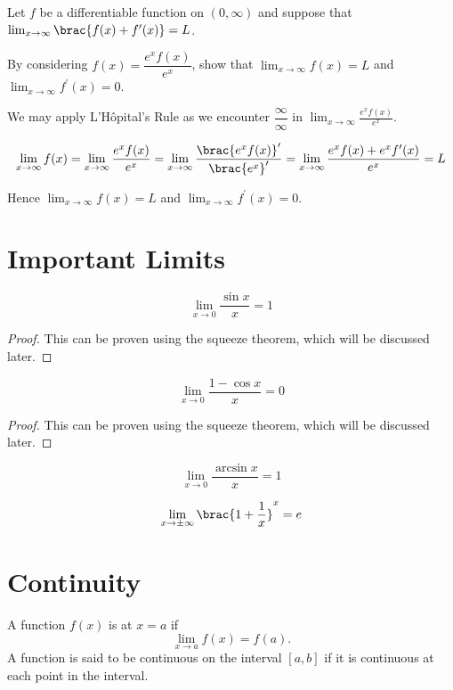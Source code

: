 \begin{exercise}
Let $f$ be a differentiable function on $(0,\infty)$ and suppose that $\lim_{x\to\infty}\brac{f(x)+f^\prime(x)}=L$.

By considering $f(x)=\dfrac{e^xf(x)}{e^x}$, show that $\lim_{x\to\infty}f(x)=L$ and $\lim_{x\to\infty}f^\prime(x)=0$.
\end{exercise}

\begin{solution}
We may apply L'H\^{o}pital's Rule as we encounter $\dfrac{\infty}{\infty}$ in $\displaystyle\lim_{x\to\infty}\frac{e^xf(x)}{e^x}$.

\[ \lim_{x\to\infty}f(x)=\lim_{x\to\infty}\frac{e^xf(x)}{e^x}=\lim_{x\to\infty}\frac{\brac{e^xf(x)}^\prime}{\brac{e^x}^\prime}=\lim_{x\to\infty}\frac{e^xf(x)+e^xf^\prime(x)}{e^x}=L \]

Hence $\lim_{x\to\infty}f(x)=L$ and $\lim_{x\to\infty}f^\prime(x)=0$.
\end{solution}
\pagebreak



\section{Important Limits}
\begin{equation}
\lim_{x \to 0} \frac{\sin x}{x} = 1
\end{equation}
\begin{proof}
This can be proven using the squeeze theorem, which will be discussed later.
\end{proof}

\begin{equation}
\lim_{x \to 0} \frac{1-\cos x}{x} = 0
\end{equation}
\begin{proof}
This can be proven using the squeeze theorem, which will be discussed later.
\end{proof}

\begin{equation}
\lim_{x\to 0} \frac{\arcsin x}{x} = 1
\end{equation}

\begin{equation}
\lim_{x\to \pm\infty} \brac{1+\frac{1}{x}}^x=e
\end{equation}
\pagebreak

\section{Continuity}
\begin{definition}
A function $f(x)$ is  at $x=a$ if 
\[ \lim_{x\to a} f(x)=f(a). \]
A function is said to be continuous on the interval $[a,b]$ if it is continuous at each point in the interval.
\end{definition}

